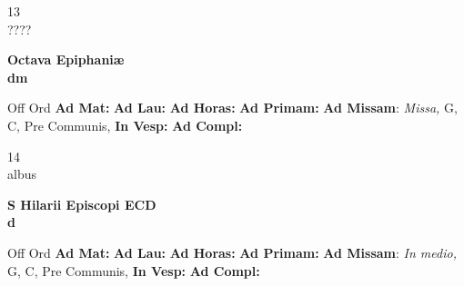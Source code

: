 \documentclass[10pt, openany]{book}
\begin{document}
    \begin{center}
        \begin{minipage}{3.5in}
            \vspace{2em}
            \begin{minipage}{0.5in}
                {\Huge 13} \\
                {\normalsize ????}
            \end{minipage}
            \begin{minipage}{3.0in}
                \textbf{ \large Octava Epiphaniæ \\
                \textnormal{\normalsize dm}}

            \end{minipage}
            \begin{justify}Off Ord
                \textbf{Ad Mat: }
                \textbf{Ad Lau: }
                \textbf{Ad Horas: }
                \textbf{Ad Primam: }\textbf{Ad Missam}: \textit{Missa,} G, C, Pre Communis, 
                \textbf{In Vesp: }
                \textbf{Ad Compl: }
            \end{justify}
        \end{minipage}
    \end{center}

    \begin{center}
        \begin{minipage}{3.5in}
            \vspace{2em}
            \begin{minipage}{0.5in}
                {\Huge 14} \\
                {\normalsize albus}
            \end{minipage}
            \begin{minipage}{3.0in}
                \textbf{ \large S Hilarii Episcopi ECD \\
                \textnormal{\normalsize d}}

            \end{minipage}
            \begin{justify}Off Ord
                \textbf{Ad Mat: }
                \textbf{Ad Lau: }
                \textbf{Ad Horas: }
                \textbf{Ad Primam: }\textbf{Ad Missam}: \textit{In medio,} G, C, Pre Communis, 
                \textbf{In Vesp: }
                \textbf{Ad Compl: }
            \end{justify}
        \end{minipage}
    \end{center}
\end{document}

